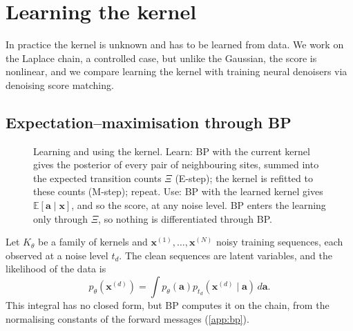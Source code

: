 \section{Learning the kernel}
\label{sec:laplace}

In practice the kernel is unknown and has to be learned from data. We work on the Laplace chain, a controlled case, but unlike the Gaussian, the score is nonlinear, and we compare learning the kernel with training neural denoisers via denoising score matching.

\subsection{Expectation--maximisation through BP}
\label{sec:em}

\begin{figure}[t]
  \centering
  
  \caption{Learning and using the kernel. Learn: BP with the current kernel gives the posterior of every pair of
  neighbouring sites, summed into the expected transition counts $\Xi$ (E-step); the kernel is refitted to these
  counts (M-step); repeat. Use: BP with the learned kernel gives $\mathbb E[\mathbf a\mid\mathbf x]$, and so the score,
  at any noise level. BP enters the learning only through $\Xi$, so nothing is differentiated through BP.}
  \label{fig:em-loop}
\end{figure}

Let $K_\theta$ be a family of kernels and $\mathbf{x}^{(1)},\ldots,\mathbf{x}^{(N)}$ noisy training sequences, each
observed at a noise level $t_d$. The clean sequences are latent variables, and the likelihood of the data is
\begin{equation}
    p_\theta(\mathbf{x}^{(d)})
    =
    \int
    p_\theta(\mathbf{a})
    p_{t_d}(\mathbf{x}^{(d)}\mid\mathbf{a})
    \,d\mathbf{a}.
\end{equation}
This integral has no closed form, but BP computes it on the chain, from the normalising constants of the forward
messages (\cref{app:bp}).

